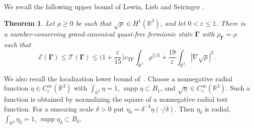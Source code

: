 \documentclass[final,reqno]{amsart}
\DeclareMathOperator{\supp}{supp}
\newtheorem{theorem}{Theorem}[section]
\theoremstyle{remark}
\theoremstyle{definition}
\renewcommand{\le}{\leqslant}
\renewcommand{\ge}{\geqslant}
\newcommand{\RR}{\mathbb{R}}
\newcommand{\TC}{\mathcal{T}}
\newcommand{\EC}{\mathcal{E}}
\newcommand{\TF}{\mathrm{TF}}
\newcommand{\vGamma}{{\bm{\Gamma}}}
\begin{document}
We recall the following upper bound of Lewin, Lieb and Seiringer \cite[Thm.~8, Rem.~9 and Cor.~11]{lewin2020local}.

\begin{theorem}\label{thm:basic_fluid}
Let $\rho\ge0$ be such that $\sqrt\rho\in H^1(\RR^3)$, and let $0<\varepsilon\le1$. There is a number-conserving grand-canonical quasi-free fermionic state $\vGamma$ with $\rho_\vGamma=\rho$ such that
\begin{equation}\label{eq:basic_fluid_bound}
\EC(\vGamma)\le\TC(\vGamma)
\le\Big(1+\frac\varepsilon{15}\Big)c_\TF\int_{\RR^3}\rho^{5/3}
+\frac{19}{\varepsilon}
\int_{\RR^3}|\nabla\sqrt\rho|^2.
\end{equation}
\end{theorem}

We also recall the localization lower bound of~\cite{lewin2020local}. Choose a nonnegative radial function $\eta\in C_c^\infty(\RR^3)$ with $\int_{\RR^3}\eta=1$, $\supp\eta\subset B_1$, and $\sqrt\eta\in C_c^\infty(\RR^3)$. Such a function is obtained by normalizing the square of a nonnegative radial test function. For a smearing scale $\delta>0$ put $\eta_\delta=\delta^{-3}\eta(\cdot/\delta)$. Then $\eta_\delta$ is radial, $\int_{\RR^3}\eta_\delta=1$, $\supp\eta_\delta\subset B_\delta$.
\end{document}
